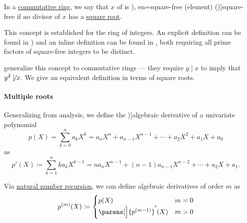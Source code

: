 \begin{definition}\label{def:square_free_element}\mimprovised
   In a \hyperref[def:ring/commutative]{commutative ring}, we say that \( x \) of is \term[ru=свободное от квадратов (число) (\cite[def. 93]{Бухштаб1966ТеорияЧисел}), en=square-free (element) (\cite[79]{JedrzejewiczEtAl2017SquareFree})]{square-free} if no  divisor of \( x \) has a \hyperref[def:nth_root]{square root}.
\end{definition}
\begin{comments}
  \item This concept is established for the ring of integers. An explicit definition can be found in \cite[def. 93]{Бухштаб1966ТеорияЧисел}) and an inline definition can be found in \cite[176]{Birkhoff1967Lattices}, both requiring all prime factors of square-free integers to be distinct.

   generalize this concept to commutative rings --- they require \( y \mid x \) to imply that \( y^2 \not\mid x \). We give an equivalent definition in terms of square roots.
\end{comments}

\paragraph{Multiple roots}

\begin{definition}\label{def:algebraic_derivative}
  Generalizing  from analysis, we define the \term[ru=производная (\cite[163]{Тыртышников2017Алгебра})]{algebraic derivative} of a univariate polynomial
  \begin{equation*}
    p(X) = \sum_{k=0}^n a_k X^k = a_n X^n + a_{n-1} X^{n-1} + \cdots + a_2 X^2 + a_1 X + a_0
  \end{equation*}
  as
  \begin{equation*}
    p'(X) \coloneqq \sum_{k=1}^n k a_k X^{k-1} = n a_n X^{n-1} + (n-1) a_{n-1} X^{n-2} + \cdots + a_2 X + a_1.
  \end{equation*}

  Via \hyperref[rem:natural_number_recursion]{natural number recursion}, we can define algebraic derivatives of order \( m \) as
  \begin{equation*}
    p^{(m)}(X) \coloneqq \begin{cases}
      p(X)              &m = 0 \\
      \parens[\Big]{ p^{(m - 1)} }'(X) &m > 0
    \end{cases}
  \end{equation*}
\end{definition}

